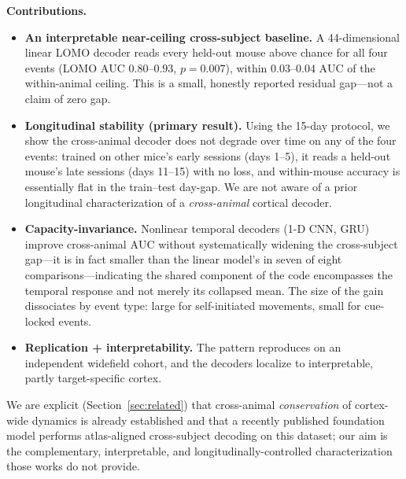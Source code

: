 \documentclass{article}
\newcommand{\auc}{\mathrm{AUC}}
\begin{document}
\textbf{Contributions.}
\begin{itemize}\itemsep2pt
\item \textbf{An interpretable near-ceiling cross-subject baseline.} A 44-dimensional linear LOMO
decoder reads every held-out mouse above chance for all four events (LOMO $\auc$ $0.80$--$0.93$,
$p=0.007$), within $0.03$--$0.04$ $\auc$ of the within-animal ceiling. This is a small, honestly
reported residual gap---not a claim of zero gap.
\item \textbf{Longitudinal stability (primary result).} Using the 15-day protocol, we show the
cross-animal decoder does not degrade over time on any of the four events: trained on other mice's
early sessions (days 1--5), it reads a held-out mouse's late sessions (days 11--15) with no loss,
and within-mouse accuracy is essentially flat in the train--test day-gap. We are not aware of a
prior longitudinal characterization of a \emph{cross-animal} cortical decoder.
\item \textbf{Capacity-invariance.} Nonlinear temporal decoders (1-D CNN, GRU) improve
cross-animal $\auc$ without systematically widening the cross-subject gap---it is in fact smaller
than the linear model's in seven of eight comparisons---indicating the shared component of the code
encompasses the temporal response and not merely its collapsed mean. The size of the gain
dissociates by event type: large for self-initiated movements, small for cue-locked events.
\item \textbf{Replication + interpretability.} The pattern reproduces on an independent widefield
cohort, and the decoders localize to interpretable, partly target-specific cortex.
\end{itemize}
We are explicit (Section~\ref{sec:related}) that cross-animal \emph{conservation} of cortex-wide
dynamics is already established and that a recently published foundation model performs
atlas-aligned cross-subject decoding on this dataset; our aim is the complementary, interpretable,
and longitudinally-controlled characterization those works do not provide.
\end{document}
